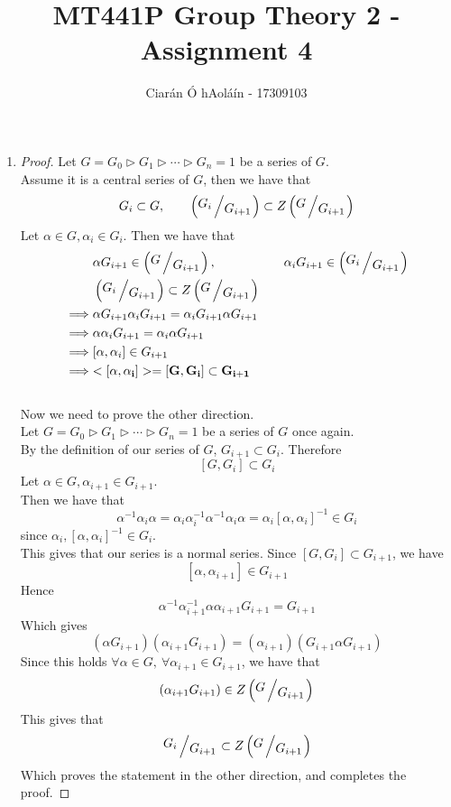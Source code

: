 \documentclass{article}
\title{MT441P Group Theory 2 - Assignment 4}
\author{Ciarán Ó hAoláín - 17309103}
\makeatletter
\let\ddd\cdots
\newcommand{\quotient}[2]{{\raisebox{.2em}{$#1$}\left/\raisebox{-.2em}{$#2$}\right.}}
\newcommand{\supgp}{\triangleright}
\theoremstyle{definition}
\theoremstyle{remark}
\theoremstyle{example}
\newcommand{\skipitems}[1]{%
	\addtocounter{\@enumctr}{#1}%
}
\makeatother
\begin{document}
	\maketitle
	\begin{enumerate}
		\skipitems{12}
		\item \begin{proof}
			Let $G=G_0 \supgp G_1 \supgp \ddd \supgp G_n={1}$ be a series of $G$.\\
			Assume it is a central series of $G$, then we have that \[G_i \subset G, \qquad \left(\quotient{G_i}{G_{i+1}}\right)\subset Z\left(\quotient{G}{G_{i+1}}\right)\]
			Let $\alpha \in G, \alpha_i \in G_i$. Then we have that 
			\begin{align*}&\alpha G_{i+1} \in \left(\quotient{G}{G_{i+1}}\right),& \quad \alpha_i G_{i+1} \in \left(\quotient{G_i}{G_{i+1}}\right) \\
			&\left(\quotient{G_i}{G_{i+1}}\right) \subset Z \left(\quotient{G}{G_{i+1}}\right)\\ \implies & \alpha G_{i+1}\alpha_iG_{i+1}=\alpha_i G_{i+1}\alpha G_{i+1} \\
			\implies & \alpha \alpha_i G_{i+1} = \alpha_i \alpha G_{i+1}\\
			\implies & [\alpha, \alpha_i] \in G_{i+1}\\
			\implies&  \mathbf{<[\alpha, \alpha_i]>=[G,G_i] \subset G_{i+1}}
			\end{align*}
			\\
			Now we need to prove the other direction.\\
			Let $G=G_0 \supgp G_1 \supgp \ddd \supgp G_n={1}$ be a series of $G$ once again.\\
			By the definition of our series of $G$, $G_{i+1} \subset G_i$. Therefore \[ [G,G_i] \subset G_i \]
			Let $\alpha \in G, \alpha_{i+1} \in G_{i+1}$.\\
			Then we have that \[ \alpha^{-1}\alpha_i\alpha=\alpha_i\alpha_i^{-1}\alpha^{-1}\alpha_i\alpha=\alpha_i[\alpha,\alpha_i]^{-1}\in G_i \] since $\alpha_i, [\alpha,\alpha_i]^{-1} \in G_i$.\\
			This gives that our series is a normal series.
			Since $[G,G_i]\subset G_{i+1}$, we have \[ [\alpha,\alpha_{i+1}] \in G_{i+1} \]
			Hence
			\[ \alpha^{-1}\alpha_{i+1}^{-1}\alpha\alpha_{i+1}G_{i+1}=G_{i+1} \]
			Which gives
			\[ \left(\alpha G_{i+1}\right) \left(\alpha_{i+1}G_{i+1}\right)=\left(\alpha_{i+1}\right)\left(G_{i+1} \alpha G_{i+1}\right) \]
			Since this holds $\forall \alpha \in G, \ \forall \alpha_{i+1} \in G_{i+1}$, we have that
			\[ \left(\alpha_{i+1}G_{i+1}\right) \in Z \left(\quotient{G}{G_{i+1}}\right) \]
			This gives that \[  \quotient{G_i}{G_{i+1}} \subset Z\left(\quotient{G}{G_{i+1}}\right) \]
			Which proves the statement in the other direction, and completes the proof.
		\end{proof}
	

\end{enumerate}
\end{document}
